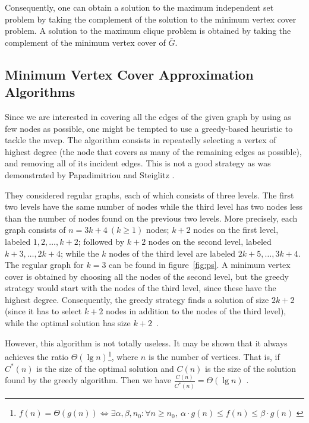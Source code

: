 \documentclass[12pt]{article}
\begin{document}
Consequently, one can obtain a solution to the maximum independent set
problem by taking the complement of the solution to the minimum vertex cover
problem. A solution to the maximum clique problem is obtained by
taking the complement of the minimum vertex cover of $\bar{G}$.

\subsection{Minimum Vertex Cover Approximation Algorithms}
\label{sec:ra}
Since we are interested in covering all the edges of the
given graph by using as few nodes as possible, one might
be tempted to use a greedy-based heuristic to tackle the
mvcp.
The algorithm consists in repeatedly selecting a
vertex of highest degree (the node that covers as many
of the remaining edges as possible), and removing all
of its incident edges.
This is not a good strategy as was demonstrated
by Papadimitriou and Steiglitz \cite[p.~407]{10:mvcp}.

They considered regular graphs, each of which consists of three levels.
The first two levels have the same
number of nodes while the third level has two nodes less
than the number of nodes found on the previous two
levels.
More precisely, each graph consists of $n = 3k + 4 \ (k \geq 1)$
nodes; $k+2$ nodes on the first level, labeled $1, 2, \dots, k+2$;
followed by $k+2$ nodes on the second level, labeled $k+3, \dots, 2k+4$;
while the $k$ nodes of the third level are labeled $2k+5, \dots, 3k+4$.
The regular graph for $k = 3$ can be found in figure~\ref{fig:ps}.
A minimum vertex cover is obtained by choosing all
the nodes of the second level, but the greedy strategy
would start with the nodes of the third level, since these
have the highest degree. Consequently, the greedy strategy
finds a solution of size $2k + 2$ (since it has to select $k + 2$
nodes in addition to the nodes of the third level), while
the optimal solution has size $k + 2$~\cite{mvcp-back}.

However, this algorithm is not totally useless. It may be shown that it always
achieves the ratio $\Theta(\lg n)$\footnote[2]{$f(n) = \Theta(g(n)) \iff
\exists \alpha, \beta, n_0 : \forall n \geq n_0, \ 
\alpha \cdot g(n) \leq f(n) \leq \beta \cdot g(n)$ \cite[pp.~41--43]{cormen}},
where $n$ is the number of vertices.
That is, if $C^*(n)$ is the size of the optimal
solution and $C(n)$ is the size of the solution found by the greedy
algorithm. Then we have $\frac{C(n)}{C^*(n)} = \Theta(\lg n)$ \cite[p.~323]{9:mvcp}.
\end{document}
